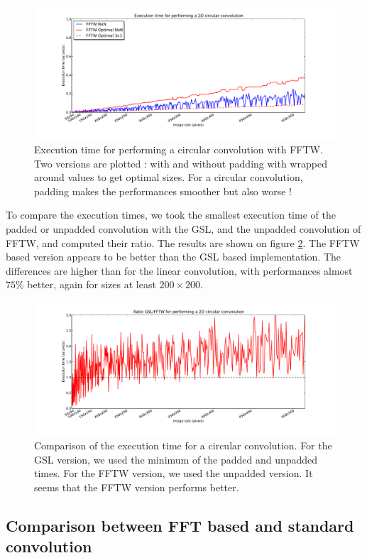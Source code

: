 \documentclass[a4paper,10pt,twoside]{article}
\begin{document}
\begin{figure}[htbp]
\center \includegraphics[width=0.75\linewidth]{../Images/benchmark_circular_convolution_fftw.pdf}
\caption{\label{fig:benchmark_circular_convolution_fftw.pdf}Execution time for performing a circular convolution with FFTW. Two versions are plotted : with and without padding with wrapped around values to get optimal sizes. For a circular convolution, padding makes the performances smoother but also worse !}
\end{figure}


To compare the execution times, we took the smallest execution time of the padded or unpadded convolution with the GSL, and the unpadded convolution of FFTW, and computed their ratio. The results are shown on figure \ref{fig:benchmark_circular_convolution_compare.pdf}. The FFTW based version appears to be better than the GSL based implementation. The differences are higher than for the linear convolution, with performances almost $75\%$ better, again for sizes at least $200 \times 200$.

\begin{figure}[htbp]
\center \includegraphics[width=0.75\linewidth]{../Images/benchmark_circular_convolution_compare.pdf}
\caption{\label{fig:benchmark_circular_convolution_compare.pdf} Comparison of the execution time for a circular convolution. For the GSL version, we used the minimum of the padded and unpadded times. For the FFTW version, we used the unpadded version. It seems that the FFTW version performs better.}
\end{figure}

\pagebreak
\subsection{Comparison between FFT based and standard convolution}
\end{document}
